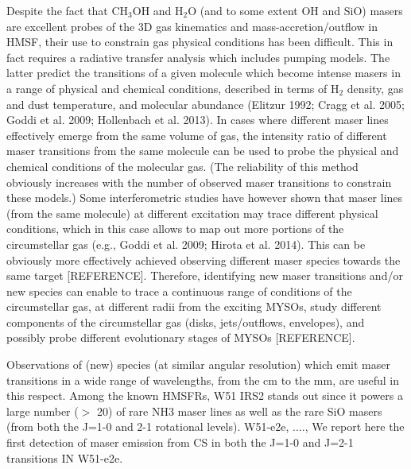 \documentclass[twocolumn]{aastex62}
\begin{document}
{Despite the fact that CH$_3$OH and H$_2$O (and to some extent OH and SiO) masers are excellent probes of the 3D gas kinematics and mass-accretion/outflow in HMSF, 
their use to constrain gas physical conditions has been difficult.
This in fact requires a radiative transfer analysis which includes pumping models.
The latter predict the transitions of a given molecule which become intense masers in a
range of physical and chemical conditions, described in terms of H$_2$ density, gas and dust temperature,
and molecular abundance (Elitzur 1992; Cragg et al. 2005; Goddi et al. 2009; Hollenbach et al. 2013).
In cases where different maser lines effectively emerge from the same volume of gas, the intensity ratio of
different maser transitions from the same molecule can be used to probe the physical and chemical
conditions of the molecular gas. (The reliability of this method obviously increases with the number
of observed maser transitions to constrain these models.) %
Some interferometric studies have however shown that maser lines (from the same molecule) at different
excitation may trace different physical conditions, which in this case allows to map out more portions of the circumstellar gas  (e.g., Goddi et al. 2009; Hirota et al. 2014).
This can be obviously more effectively achieved  observing  different maser species towards the same target [REFERENCE]. 
Therefore, identifying new maser transitions and/or new species  can enable to trace a continuous range of conditions of the circumstellar gas, at different radii from
the exciting MYSOs,
study different components of the circumstellar gas (disks, jets/outflows, envelopes), and
possibly probe different evolutionary stages of MYSOs [REFERENCE].

Observations of (new) species (at similar angular resolution) which emit maser transitions in a wide range of wavelengths, from the cm to the mm, are useful in this respect. 
Among the known HMSFRs, W51 IRS2 stands out since it powers a large number ($>$ 20) of rare NH3 maser lines as well as the rare SiO masers (from both the J=1-0 and 2-1 rotational levels).
W51-e2e, ....,
We report here  the first detection of maser emission from CS in both
the J=1-0 and J=2-1 transitions IN W51-e2e.}
\end{document}

